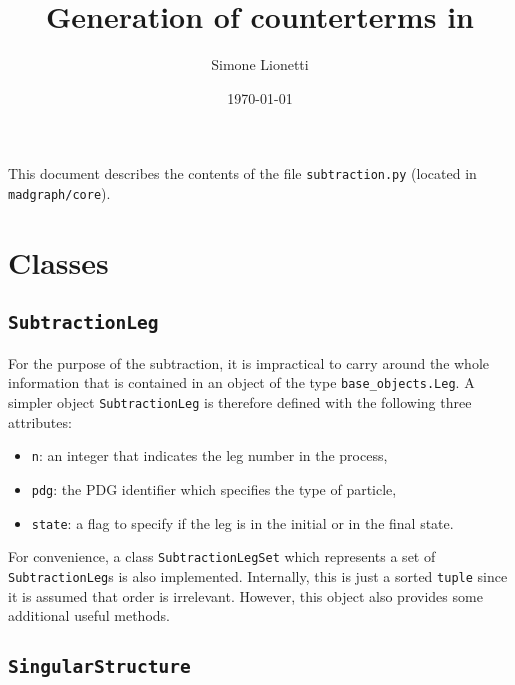 \documentclass[11pt,a4paper]{article}
\title{Generation of counterterms in \MadNkLO}
\author{Simone Lionetti}
\date{\today}
\begin{document}
\maketitle

This document describes the contents of the file \texttt{subtraction.py}
(located in \texttt{madgraph/core}).


\section{Classes}


\subsection{\texttt{SubtractionLeg}}
\label{ssec:subtractionleg}

For the purpose of the subtraction,
it is impractical to carry around the whole information
that is contained in an object of the type \texttt{base\_objects.Leg}.
A simpler object \texttt{SubtractionLeg} is therefore defined
with the following three attributes:
\begin{itemize}
	\item \texttt{n}: an integer that indicates the leg number in the process,
	\item \texttt{pdg}: the PDG identifier which specifies the type of particle,
	\item \texttt{state}: a flag to specify if the leg
		is in the initial or in the final state.
\end{itemize}

For convenience, a class \texttt{SubtractionLegSet} which represents
a set of \texttt{SubtractionLeg}s is also implemented.
Internally, this is just a sorted \texttt{tuple} since it is assumed
that order is irrelevant.
However, this object also provides some additional useful methods.


\subsection{\texttt{SingularStructure}}
\label{ssec:singularstructure}
\end{document}
